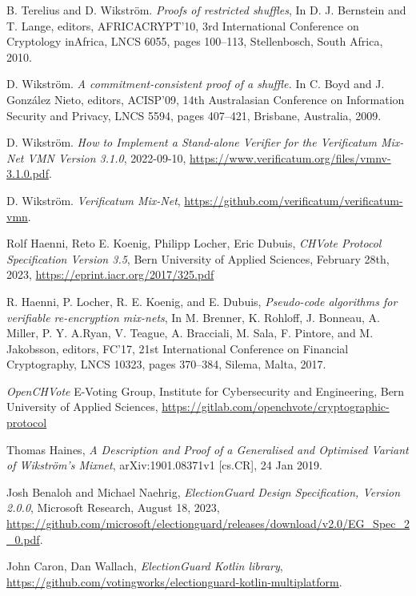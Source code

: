 \documentclass{article}
\begin{document}
\begin{thebibliography}{999}

  B. Terelius and D. Wikström. 
  \emph{Proofs of restricted shuffles},
  In D. J. Bernstein and T. Lange, editors, AFRICACRYPT'10, 
  3rd International Conference on Cryptology inAfrica, LNCS 6055, pages 100--113, 
  Stellenbosch, South Africa, 2010. 

 D. Wikström. 
  \emph{A commitment-consistent proof of a shuffle.} 
  In C. Boyd and J. González Nieto, editors, 
  ACISP'09, 14th Australasian Conference on Information Security and Privacy, LNCS 5594, pages 407--421,
  Brisbane, Australia, 2009. 

 D. Wikström. 
  \emph{How to Implement a Stand-alone Verifier for the Verificatum Mix-Net VMN Version 3.1.0},
  2022-09-10, 
  \url{https://www.verificatum.org/files/vmnv-3.1.0.pdf}.

 D. Wikström. 
  \emph{Verificatum Mix-Net},
  \url{https://github.com/verificatum/verificatum-vmn}.

  Rolf Haenni, Reto E. Koenig, Philipp Locher, Eric Dubuis,
  \emph{CHVote Protocol Specification Version 3.5}, 
  Bern University of Applied Sciences,
  February 28th, 2023, 
  \url{https://eprint.iacr.org/2017/325.pdf} 
  
  R. Haenni, P. Locher, R. E. Koenig, and E. Dubuis,
  \emph{Pseudo-code algorithms for verifiable re-encryption mix-nets},
  In M. Brenner, K. Rohloff, J. Bonneau, A. Miller, P. Y. A.Ryan, V. Teague, A. Bracciali, M. Sala, F. Pintore, and M. Jakobsson, editors, 
  FC'17, 21st International Conference on Financial Cryptography, LNCS 10323, pages 370--384,
  Silema, Malta, 2017. 
  
\emph{OpenCHVote}
  E-Voting Group, Institute for Cybersecurity and Engineering, 
  Bern University of Applied Sciences, 
  \url{https://gitlab.com/openchvote/cryptographic-protocol} 

  Thomas Haines, 
  \emph{A Description and Proof of a Generalised and Optimised Variant of Wikström's Mixnet}, arXiv:1901.08371v1 {[}cs.CR{]},
  24 Jan 2019.

  Josh Benaloh and Michael Naehrig,
  \emph{ElectionGuard Design Specification, Version 2.0.0},
  Microsoft Research, 
  August 18, 2023,
  \url{https://github.com/microsoft/electionguard/releases/download/v2.0/EG\_Spec\_2\_0.pdf}.
  
  John Caron, Dan Wallach, 
  \emph{ElectionGuard Kotlin library}, 
  \url{https://github.com/votingworks/electionguard-kotlin-multiplatform}.
  
\end{thebibliography}
\end{document}
